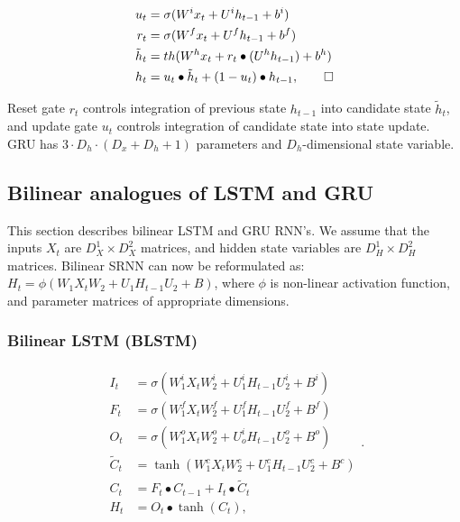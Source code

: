 \documentclass[a4paper,11pt]{article}
\begin{document}
\begin{align}
\begin{split}
\label{LSTM}
u_{t} &=\sigma(W^{i}x_{t} + U^{i}h_{t-1} + b^{i})\\
r_{t} &=\sigma(W^{f}x_{t} + U^{f}h_{t-1} + b^{f})\\
\tilde{h}_{t} &= th(W^{h}x_{t} + r_{t} \bullet (U^{h}h_{t-1}) + b^{h})\\
h_{t} &= u_{t} \bullet \tilde{h}_{t} + (1 - u_{t}) \bullet h_{t-1}, \qedhere
\end{split}
\end{align}

\noindent Reset gate $r_{t}$ controls integration of previous state $h_{t-1}$ into candidate state $\tilde{h}_{t}$, and update gate $u_{t}$ controls integration of candidate state into state update. GRU has $ 3 \cdot D_{h} \cdot (D_{x}  + D_{h} + 1) $ parameters and $D_{h}$-dimensional state variable.




\subsection{Bilinear analogues of LSTM and GRU}


This section describes bilinear LSTM and GRU RNN's. We assume that the inputs $X_{t}$ are $D_{X}^{1} \times D_{X}^{2}$ matrices, and hidden state variables are $D_{H}^{1} \times D_{H}^{2}$ matrices. Bilinear SRNN can now be reformulated as:
$H_{t} = \phi(W_{1}X_{t}W_{2} + U_{1}H_{t-1}U_{2} + B)$, where $\phi$ is non-linear activation function, and parameter matrices of appropriate dimensions.


\subsubsection{Bilinear LSTM (BLSTM)} 
\begin{align}
\begin{split}
I_{t} &=\sigma(W_{1}^{i}X_{t}W_{2}^{i} + U_{1}^{i}H_{t-1}U_{2}^{i}  +  B^{i})\\
F_{t} &=\sigma(W_{1}^{f}X_{t}W_{2}^{f} + U_{1}^{f}H_{t-1}U_{2}^{f}  +  B^{f})\\
O_{t} &=\sigma(W_{1}^{o}X_{t}W_{2}^{o} + U_{o}^{i}H_{t-1}U_{2}^{o}  +  B^{o})\\
\tilde{C}_{t} &=\tanh(W_{1}^{c}X_{t}W_{2}^{c} + U_{1}^{c}H_{t-1}U_{2}^{c}  +  B^{c})\\
C_{t} &= F_{t} \bullet C_{t-1} + I_{t} \bullet \tilde{C}_{t}\\
H_{t} &= O_{t}\bullet \tanh(C_{t}),
\end{split}.
\end{align}
\end{document}
